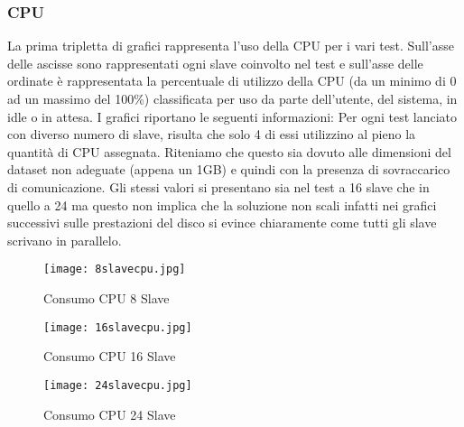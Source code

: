 \subsubsection{CPU}
La prima tripletta di grafici rappresenta l'uso della CPU per i vari test. Sull'asse delle ascisse sono rappresentati ogni slave coinvolto nel test e sull'asse delle ordinate è rappresentata la percentuale di utilizzo della CPU (da un minimo di 0 ad un massimo del 100\%) classificata per uso da parte dell'utente, del sistema, in idle o in attesa. I grafici riportano le seguenti informazioni: Per ogni test lanciato con diverso numero di slave, risulta che solo 4 di essi utilizzino al pieno la quantità di CPU assegnata. Riteniamo che questo sia dovuto alle dimensioni del dataset non adeguate (appena un 1GB) e quindi con la presenza di sovraccarico di comunicazione. Gli stessi valori si presentano sia nel test a 16 slave che in quello a 24 ma questo non implica che la soluzione non scali infatti nei grafici successivi sulle prestazioni del disco si evince chiaramente come tutti gli slave scrivano in parallelo.
\begin{figure}[H]
	\begin{center}
		\texttt{[image: 8slavecpu.jpg]}
		\caption{Consumo CPU 8 Slave}
		\label{fg:8slavecpu.jpg}
	\end{center}
\end{figure}

\begin{figure}[H]
	\begin{center}
		\texttt{[image: 16slavecpu.jpg]}
		\caption{Consumo CPU 16 Slave}
		\label{fg:16slavecpu.jpg}
	\end{center}
\end{figure}

\begin{figure}[H]
	\begin{center}
		\texttt{[image: 24slavecpu.jpg]}
		\caption{Consumo CPU 24 Slave}
		\label{fg:24slavecpu.jpg}
	\end{center}
\end{figure}


